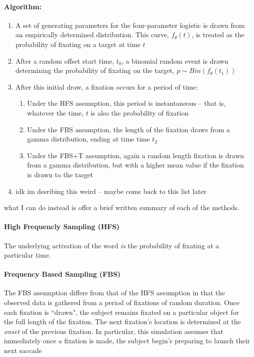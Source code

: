 \documentclass{article}
\begin{document}
\paragraph{Algorithm:}
\begin{singlespace}
\begin{enumerate}
\item A set of generating parameters for the four-parameter logistic is drawn from an empirically determined distribution. This curve, $f_{\theta}(t)$, is treated as the probability of fixating on a target at time $t$
\item After a random offset start time, $t_0$, a binomial random event is drawn determining the probability of fixating on the target, $p \sim Bin(f_{\theta}(t_1))$
\item After this initial draw, a fixation occurs for a period of time:
\begin{enumerate}
\item Under the HFS assumption, this period is instantaneous -- that is, whatever the time, $t$ is also the probability of fixation
\item Under the FBS assumption, the length of the fixation draws from a gamma distribution, ending at time time $t_2$
\item Under the FBS+T assumption, again a random length fixation is drawn from a gamma distribution, but with a higher mean value if the fixation is drawn to the target
\end{enumerate}
\item idk im desribing this weird -- maybe come back to this list later
\end{enumerate}
\end{singlespace}

what I can do instead is offer a brief written summary of each of the methods.

\paragraph{High Frequencly Sampling (HFS)} The underlying activation of the word \textit{is} the probability of fixating at a particular time.

\paragraph{Frequency Based Sampling (FBS)} The FBS assumption differs from that of the HFS assumption in that the observed data is gathered from a period of fixations of random duration. Once each fixation is ``drawn", the subject remains fixated on a particular object for the full length of the fixation. The next fixation's location is determined at the \textit{onset} of the previous fixation. In particular, this simulation assumes that immediately once a fixation is made, the subject begin's preparing to launch their next saccade
\end{document}
